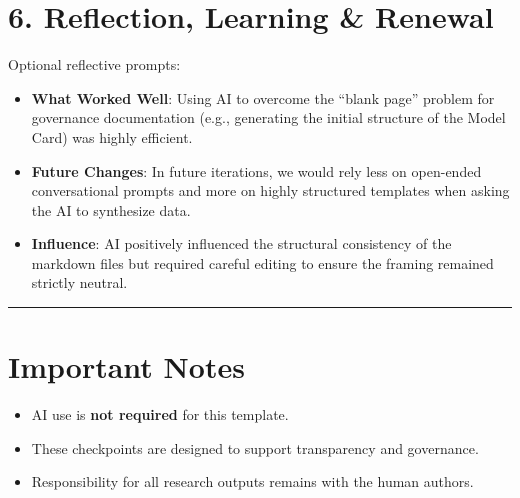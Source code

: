 \documentclass[
]{report}
\providecommand{\tightlist}{%
  \setlength{\itemsep}{0pt}\setlength{\parskip}{0pt}}
\begin{document}
\section{6. Reflection, Learning \&
Renewal}\label{reflection-learning-renewal}

Optional reflective prompts:

\begin{itemize}
\tightlist
\item
  \textbf{What Worked Well}: Using AI to overcome the ``blank page''
  problem for governance documentation (e.g., generating the initial
  structure of the Model Card) was highly efficient.
\item
  \textbf{Future Changes}: In future iterations, we would rely less on
  open-ended conversational prompts and more on highly structured
  templates when asking the AI to synthesize data.
\item
  \textbf{Influence}: AI positively influenced the structural
  consistency of the markdown files but required careful editing to
  ensure the framing remained strictly neutral.
\end{itemize}

\begin{center}\rule{0.5\linewidth}{0.5pt}\end{center}

\section{Important Notes}\label{important-notes}

\begin{itemize}
\tightlist
\item
  AI use is \textbf{not required} for this template.
\item
  These checkpoints are designed to support transparency and governance.
\item
  Responsibility for all research outputs remains with the human
  authors.
\end{itemize}
\end{document}

